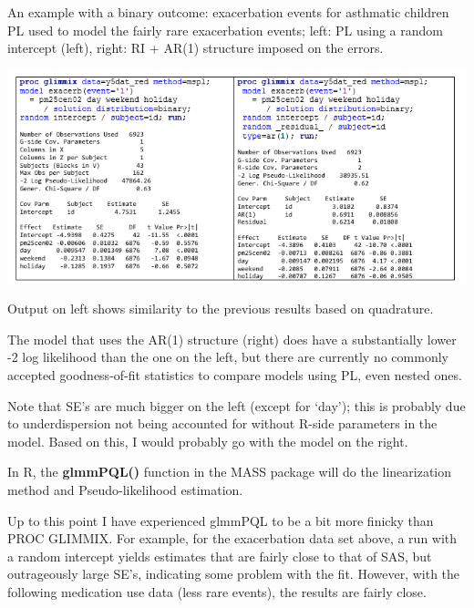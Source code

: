 \documentclass[
  9pt,
  ignorenonframetext,
]{beamer}
\begin{document}
\begin{frame}{An example with a binary outcome: exacerbation events for
asthmatic children}
\protect\hypertarget{an-example-with-a-binary-outcome-exacerbation-events-for-asthmatic-children}{}
PL used to model the fairly rare exacerbation events; left: PL using a
random intercept (left), right: RI + AR(1) structure imposed on the
errors.

\begin{center}\includegraphics[width=0.7\linewidth]{figs_L16/f6} \end{center}

Output on left shows similarity to the previous results based on
quadrature.

The model that uses the AR(1) structure (right) does have a
substantially lower -2 log likelihood than the one on the left, but
there are currently no commonly accepted goodness-of-fit statistics to
compare models using PL, even nested ones.
\end{frame}

\begin{frame}{}
\protect\hypertarget{section-6}{}
Note that SE's are much bigger on the left (except for `day'); this is
probably due to underdispersion not being accounted for without R-side
parameters in the model. Based on this, I would probably go with the
model on the right.

In R, the \textbf{glmmPQL()} function in the MASS package will do the
linearization method and Pseudo-likelihood estimation.

Up to this point I have experienced glmmPQL to be a bit more finicky
than PROC GLIMMIX. For example, for the exacerbation data set above, a
run with a random intercept yields estimates that are fairly close to
that of SAS, but outrageously large SE's, indicating some problem with
the fit. However, with the following medication use data (less rare
events), the results are fairly close.
\end{frame}
\end{document}
